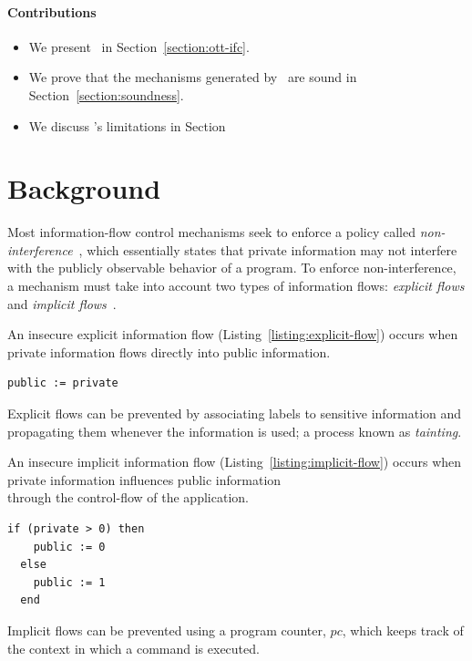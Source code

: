 \documentclass[sigplan,10pt,screen]{acmart}
\begin{document}
\paragraph{Contributions}
\begin{itemize}
	\item We present \ottifc\ in Section~\ref{section:ott-ifc}.
	\item We prove that the mechanisms generated by \ottifc\ are sound in Section~\ref{section:soundness}.
	\item We discuss \ottifc's limitations in Section
\end{itemize}

\newpage
\section{Background}\label{section:background}
Most information-flow control mechanisms seek to enforce a policy called \emph{non-interference}~\cite{DBLP:conf/sp/GoguenM82a}, which essentially states that private information may not interfere with the publicly observable behavior of a program. To enforce non-interference, a mechanism must take into account two types of information flows: \emph{explicit flows} and \emph{implicit flows}~\cite{DBLP:journals/cacm/Denning76}. 

An insecure explicit information flow (Listing~\ref{listing:explicit-flow}) occurs when private information flows directly into public information. 
\begin{lstlisting}[captionpos=b, caption=Insecure explicit flow, label=listing:explicit-flow]
  public := private
\end{lstlisting}
Explicit flows can be prevented by associating labels to sensitive information and propagating them whenever the information is used; a process known as \emph{tainting}.

An insecure implicit information flow (Listing~\ref{listing:implicit-flow}) occurs when private information influences public information\\through the control-flow of the application.

\begin{lstlisting}[captionpos=b, caption=Insecure implicit flow, label=listing:implicit-flow]
  if (private > 0) then
    public := 0
  else
    public := 1
  end
\end{lstlisting}
Implicit flows can be prevented using a program counter, $pc$, which keeps track of the context in which a command is executed.
\end{document}
